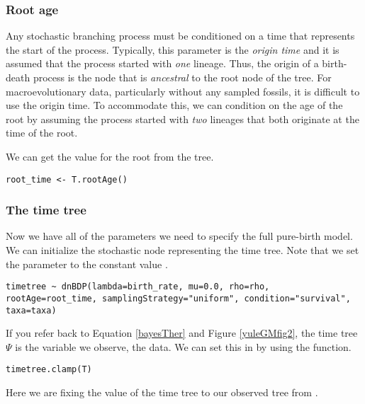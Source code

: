 \subsubsection{Root age}

Any stochastic branching process must be conditioned on a time that represents the start of the process. 
Typically, this parameter is the \textit{origin time} and it is assumed that the process started with \textit{one} lineage. 
Thus, the origin of a birth-death process is the node that is \textit{ancestral} to the root node of the tree.
For macroevolutionary data, particularly without any sampled fossils, it is difficult to use the origin time.
To accommodate this, we can condition on the age of the root by assuming the process started with \textit{two} lineages that both originate at the time of the root.

We can get the value for the root from the \citet{Springer2012} tree.

{\tt \begin{snugshade*}
\begin{lstlisting}
root_time <- T.rootAge()
\end{lstlisting}
\end{snugshade*}}

\subsubsection{The time tree}

Now we have all of the parameters we need to specify the full pure-birth model. 
We can initialize the stochastic node representing the time tree.
Note that we set the  parameter to the constant value .
{\tt \begin{snugshade*}
\begin{lstlisting}
timetree ~ dnBDP(lambda=birth_rate, mu=0.0, rho=rho, rootAge=root_time, samplingStrategy="uniform", condition="survival", taxa=taxa)
\end{lstlisting}
\end{snugshade*}}

If you refer back to Equation \ref{bayesTher} and Figure \ref{yuleGMfig2}, the time tree $\Psi$ is the variable we observe, \IE the data. 
We can set this in \Rev by using the  function.
{\tt \begin{snugshade*}
\begin{lstlisting}
timetree.clamp(T)
\end{lstlisting}
\end{snugshade*}}
Here we are fixing the value of the time tree to our observed tree from \citet{Springer2012}.


